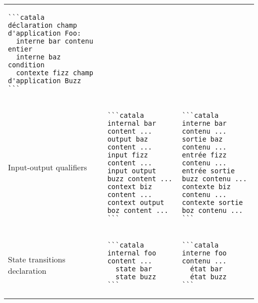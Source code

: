 \documentclass[a3paper,landscape]{article}
\begin{document}
\begin{multicols*}{2}
\begin{tabular}{p{}p{}p{}}
\begin{verbatim}
```catala
déclaration champ d'application Foo:
  interne bar contenu entier
  interne baz condition
  contexte fizz champ d'application Buzz
```
\end{verbatim}
    \vspace*{-1.75em}                                              \\
    Input-output qualifiers       &
    \vspace*{-1.75em}
    \begin{verbatim}
```catala
internal bar content ...
output baz content ...
input fizz content ...
input output buzz content ...
context biz content ...
context output boz content ...
```
\end{verbatim}
    \vspace*{-1.75em}
                                  &
    \vspace*{-1.75em}
    \begin{verbatim}
```catala
interne bar contenu ...
sortie baz contenu ...
entrée fizz contenu ...
entrée sortie buzz contenu ...
contexte biz contenu ...
contexte sortie boz contenu ...
```
\end{verbatim}
    \vspace*{-1.75em}                                              \\
    State transitions declaration &
    \vspace*{-1.75em}
    \begin{verbatim}
```catala
internal foo content ...
  state bar
  state buzz
```
\end{verbatim}
    \vspace*{-1.75em}
                                  &
    \vspace*{-1.75em}
    \begin{verbatim}
```catala
interne foo contenu ...
  état bar
  état buzz
```
\end{verbatim}
    \vspace*{-1.75em}                                              \\
    \bottomrule
  \end{tabular}












\end{multicols*}
\end{document}
